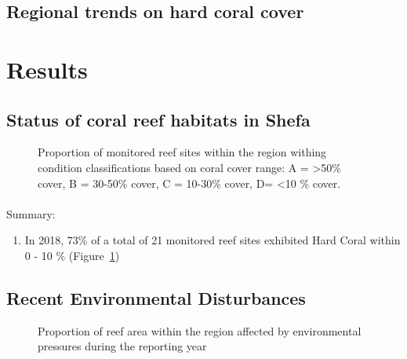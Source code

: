 \documentclass[
  letterpaper,
  DIV=11,
  numbers=noendperiod]{scrartcl}
\makeatletter
\let\oldparagraph\paragraph
\renewcommand{\paragraph}{
    \@ifstar
      \xxxParagraphStar
      \xxxParagraphNoStar
  }
\newcommand{\xxxParagraphStar}[1]{\oldparagraph*{#1}\mbox{}}
\newcommand{\xxxParagraphNoStar}[1]{\oldparagraph{#1}\mbox{}}
\providecommand{\tightlist}{%
  \setlength{\itemsep}{0pt}\setlength{\parskip}{0pt}}\usepackage{longtable,booktabs,array}
\makeatother
\begin{document}
\subsection{Regional trends on hard coral
cover}\label{regional-trends-on-hard-coral-cover}

\pagebreak

\section{Results}\label{results}

\subsection{Status of coral reef habitats in
Shefa}\label{status-of-coral-reef-habitats-in-shefa}

\begin{figure}[H]


\caption{\label{fig-waffle}Proportion of monitored reef sites within the
region withing condition classifications based on coral cover range: A =
\textgreater50\% cover, B = 30-50\% cover, C = 10-30\% cover, D=
\textless10 \% cover.}

\end{figure}%

\paragraph{Summary:}\label{summary}

\begin{enumerate}
\def\labelenumi{\arabic{enumi}.}
\tightlist
\item
  In 2018, 73\% of a total of 21 monitored reef sites exhibited Hard
  Coral within 0 - 10 \% (Figure~\ref{fig-waffle})
\end{enumerate}

\pagebreak

\subsection{Recent Environmental
Disturbances}\label{recent-environmental-disturbances}

\begin{figure}[H]


\caption{\label{fig-env_dist}Proportion of reef area within the region
affected by environmental pressures during the reporting year}

\end{figure}%
\end{document}
